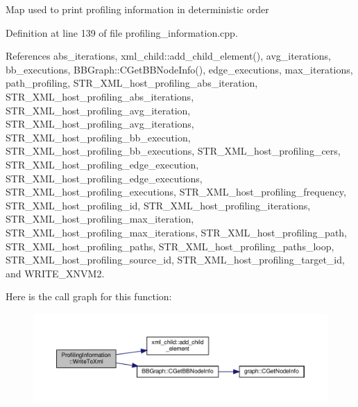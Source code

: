 Map used to print profiling information in deterministic order 

Definition at line 139 of file profiling\+\_\+information.\+cpp.



References abs\+\_\+iterations, xml\+\_\+child\+::add\+\_\+child\+\_\+element(), avg\+\_\+iterations, bb\+\_\+executions, B\+B\+Graph\+::\+C\+Get\+B\+B\+Node\+Info(), edge\+\_\+executions, max\+\_\+iterations, path\+\_\+profiling, S\+T\+R\+\_\+\+X\+M\+L\+\_\+host\+\_\+profiling\+\_\+abs\+\_\+iteration, S\+T\+R\+\_\+\+X\+M\+L\+\_\+host\+\_\+profiling\+\_\+abs\+\_\+iterations, S\+T\+R\+\_\+\+X\+M\+L\+\_\+host\+\_\+profiling\+\_\+avg\+\_\+iteration, S\+T\+R\+\_\+\+X\+M\+L\+\_\+host\+\_\+profiling\+\_\+avg\+\_\+iterations, S\+T\+R\+\_\+\+X\+M\+L\+\_\+host\+\_\+profiling\+\_\+bb\+\_\+execution, S\+T\+R\+\_\+\+X\+M\+L\+\_\+host\+\_\+profiling\+\_\+bb\+\_\+executions, S\+T\+R\+\_\+\+X\+M\+L\+\_\+host\+\_\+profiling\+\_\+cers, S\+T\+R\+\_\+\+X\+M\+L\+\_\+host\+\_\+profiling\+\_\+edge\+\_\+execution, S\+T\+R\+\_\+\+X\+M\+L\+\_\+host\+\_\+profiling\+\_\+edge\+\_\+executions, S\+T\+R\+\_\+\+X\+M\+L\+\_\+host\+\_\+profiling\+\_\+executions, S\+T\+R\+\_\+\+X\+M\+L\+\_\+host\+\_\+profiling\+\_\+frequency, S\+T\+R\+\_\+\+X\+M\+L\+\_\+host\+\_\+profiling\+\_\+id, S\+T\+R\+\_\+\+X\+M\+L\+\_\+host\+\_\+profiling\+\_\+iterations, S\+T\+R\+\_\+\+X\+M\+L\+\_\+host\+\_\+profiling\+\_\+max\+\_\+iteration, S\+T\+R\+\_\+\+X\+M\+L\+\_\+host\+\_\+profiling\+\_\+max\+\_\+iterations, S\+T\+R\+\_\+\+X\+M\+L\+\_\+host\+\_\+profiling\+\_\+path, S\+T\+R\+\_\+\+X\+M\+L\+\_\+host\+\_\+profiling\+\_\+paths, S\+T\+R\+\_\+\+X\+M\+L\+\_\+host\+\_\+profiling\+\_\+paths\+\_\+loop, S\+T\+R\+\_\+\+X\+M\+L\+\_\+host\+\_\+profiling\+\_\+source\+\_\+id, S\+T\+R\+\_\+\+X\+M\+L\+\_\+host\+\_\+profiling\+\_\+target\+\_\+id, and W\+R\+I\+T\+E\+\_\+\+X\+N\+V\+M2.

Here is the call graph for this function\+:
\nopagebreak
\begin{figure}[H]
\begin{center}
\leavevmode
\includegraphics[width=350pt]{dd/d5b/classProfilingInformation_a375a5ce9e10012e523afa9514fb95e89_cgraph}
\end{center}
\end{figure}


